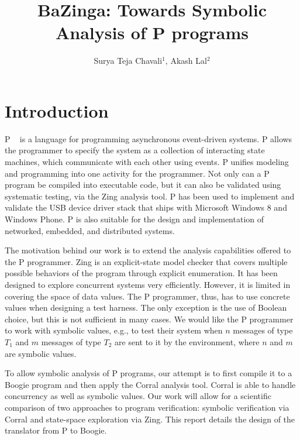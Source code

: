 \documentclass{llncs}
\begin{document}
\title{BaZinga: Towards Symbolic Analysis of P programs}

\author{Surya Teja Chavali$^1$, Akash Lal$^2$}

\maketitle

\section{Introduction}
\label{sec:intro}
P ~\cite{desai2013p} is a language for programming asynchronous event-driven systems. P allows the programmer to specify the system as a collection of interacting state machines, which communicate with each other using events. P unifies modeling and programming into one activity for the programmer. Not only can a P program be compiled into executable code, but it can also be validated using systematic testing, via the Zing \cite{zing-ref} analysis tool. P has been used to implement and validate the USB device driver stack that ships with Microsoft Windows 8 and Windows Phone. P is also suitable for the design and implementation of networked, embedded, and distributed systems.

The motivation behind our work is to extend the analysis capabilities offered to the P programmer. Zing is an explicit-state model checker that covers multiple possible behaviors of the program through explicit enumeration. It has been designed to explore concurrent systems very efficiently. However, it is limited in covering the space of data values. The P programmer, thus, has to use concrete values when designing a test harness. The only exception is the use of Boolean choice, but this is not sufficient in many cases. We would like the P programmer to work with symbolic values, e.g., to test their system when $n$ messages of type $T_1$ and $m$ messages of type $T_2$ are sent to it by the environment, where $n$ and $m$ are symbolic values.

To allow symbolic analysis of P programs, our attempt is to first compile it to a Boogie \cite{BoogiePL} program and then apply the Corral \cite{lal-cav12} analysis tool. Corral is able to handle concurrency as well as symbolic values. Our work will allow for a scientific comparison of two approaches to program verification: symbolic verification via Corral and state-space exploration via Zing. This report details the design of the translator from P to Boogie.
\end{document}
